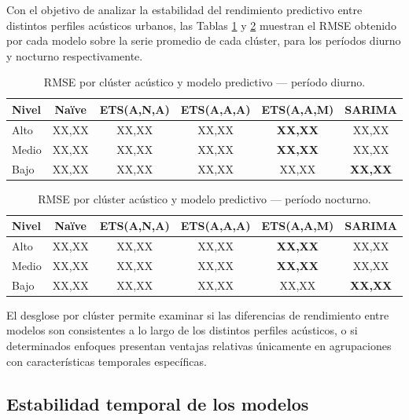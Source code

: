 Con el objetivo de analizar la estabilidad del rendimiento predictivo entre distintos perfiles acústicos urbanos, las Tablas \ref{tab:rmse_cluster_day} y \ref{tab:rmse_cluster_night} muestran el RMSE obtenido por cada modelo sobre la serie promedio de cada clúster, para los períodos diurno y nocturno respectivamente.

\begin{table}[H]
\centering
\caption{RMSE por clúster acústico y modelo predictivo — período diurno.}
\label{tab:rmse_cluster_day}
\begin{tabular}{lccccc}
\toprule
Nivel & Naïve & ETS(A,N,A) & ETS(A,A,A) & ETS(A,A,M) & SARIMA \\
\midrule
Alto  & XX{,}XX & XX{,}XX & XX{,}XX & \textbf{XX{,}XX} & XX{,}XX \\
Medio & XX{,}XX & XX{,}XX & XX{,}XX & \textbf{XX{,}XX} & XX{,}XX \\
Bajo  & XX{,}XX & XX{,}XX & XX{,}XX & XX{,}XX & \textbf{XX{,}XX} \\
\bottomrule
\end{tabular}
\end{table}

\begin{table}[H]
\centering
\caption{RMSE por clúster acústico y modelo predictivo — período nocturno.}
\label{tab:rmse_cluster_night}
\begin{tabular}{lccccc}
\toprule
Nivel & Naïve & ETS(A,N,A) & ETS(A,A,A) & ETS(A,A,M) & SARIMA \\
\midrule
Alto  & XX{,}XX & XX{,}XX & XX{,}XX & \textbf{XX{,}XX} & XX{,}XX \\
Medio & XX{,}XX & XX{,}XX & XX{,}XX & \textbf{XX{,}XX} & XX{,}XX \\
Bajo  & XX{,}XX & XX{,}XX & XX{,}XX & XX{,}XX & \textbf{XX{,}XX} \\
\bottomrule
\end{tabular}
\end{table}

El desglose por clúster permite examinar si las diferencias de rendimiento entre modelos son consistentes a lo largo de los distintos perfiles acústicos, o si determinados enfoques presentan ventajas relativas únicamente en agrupaciones con características temporales específicas.

\subsection{Estabilidad temporal de los modelos}
\label{cap5:comparacion:estabilidad}

